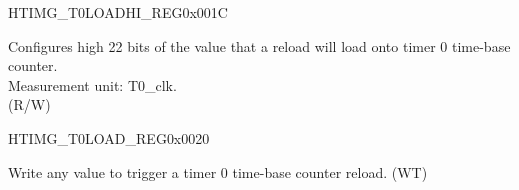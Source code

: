 \begin{register}{H}{TIMG\_T0LOADHI\_REG}{0x001C}\label{regdesc:TIMGTXLOADHIREG}
%
%
\regnewline%
\begin{regdesc}\begin{reglist}
\label{fielddesc:TIMGTXLOADHI}\item [TIMG\_T0\_LOAD\_HI] Configures high 22 bits of the value that a reload will load onto timer 0 time-base counter. \\
Measurement unit: T0\_clk. \\
(R/W)
\end{reglist}\end{regdesc}
\end{register}


\begin{register}{H}{TIMG\_T0LOAD\_REG}{0x0020}\label{regdesc:TIMGTXLOADREG}
%
\regnewline%
\begin{regdesc}\begin{reglist}
\label{fielddesc:TIMGTXLOAD}\item [TIMG\_T0\_LOAD] Write any value to trigger a timer 0 time-base counter reload. (WT)\\


\end{reglist}\end{regdesc}
\end{register}



